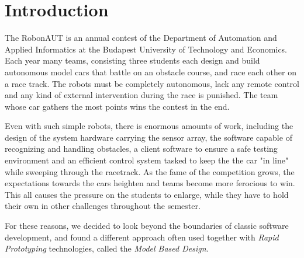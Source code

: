 \section{Introduction}
\label{sec:Introduction}


The RobonAUT is an annual contest of the Department of Automation and Applied Informatics at the Budapest University of Technology and Economics. Each year many teams, consisting three students each design and build autonomous model cars that battle on an obstacle course, and race each other on a race track. The robots must be completely autonomous, lack any remote control and any kind of external intervention during the race is punished. The team whose car gathers the most points wins the contest in the end\cite{rules}.


Even with such simple robots, there is enormous amounts of work, including the design of the system hardware carrying the sensor array, the software capable of recognizing and handling obstacles, a client software to ensure a safe testing environment and an efficient control system tasked to keep the the car "in line" while sweeping through the racetrack. As the fame of the competition grows, the expectations towards the cars heighten and teams become more ferocious to win. This all causes the pressure on the students to enlarge, while they have to hold their own in other challenges throughout the semester.


For these reasons, we decided to look beyond the boundaries of classic software development, and found a different approach often used together with \emph{Rapid Prototyping} technologies, called the \emph{Model Based Design}. 
